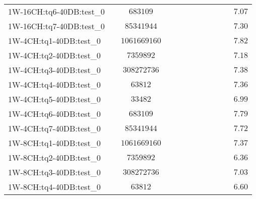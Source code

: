 \begin{tabular}{|l|c|c|c|c|c|c|c|c|c|c|c|}
1W-16CH:tq6-40DB:test\_0  & $          $ & $ 683109      $ & $       $ & $  $ & $    $ & $       $ & $  $ & $   $ & $             $ & $         $ & $ 7.07    $ \\
1W-16CH:tq7-40DB:test\_0  & $          $ & $ 85341944    $ & $       $ & $  $ & $    $ & $       $ & $  $ & $   $ & $             $ & $         $ & $ 7.30    $ \\
1W-4CH:tq1-40DB:test\_0   & $          $ & $ 1061669160  $ & $       $ & $  $ & $    $ & $       $ & $  $ & $   $ & $             $ & $         $ & $ 7.82    $ \\
1W-4CH:tq2-40DB:test\_0   & $          $ & $ 7359892     $ & $       $ & $  $ & $    $ & $       $ & $  $ & $   $ & $             $ & $         $ & $ 7.18    $ \\
1W-4CH:tq3-40DB:test\_0   & $          $ & $ 308272736   $ & $       $ & $  $ & $    $ & $       $ & $  $ & $   $ & $             $ & $         $ & $ 7.38    $ \\
1W-4CH:tq4-40DB:test\_0   & $          $ & $ 63812       $ & $       $ & $  $ & $    $ & $       $ & $  $ & $   $ & $             $ & $         $ & $ 7.36    $ \\
1W-4CH:tq5-40DB:test\_0   & $          $ & $ 33482       $ & $       $ & $  $ & $    $ & $       $ & $  $ & $   $ & $             $ & $         $ & $ 6.99    $ \\
1W-4CH:tq6-40DB:test\_0   & $          $ & $ 683109      $ & $       $ & $  $ & $    $ & $       $ & $  $ & $   $ & $             $ & $         $ & $ 7.79    $ \\
1W-4CH:tq7-40DB:test\_0   & $          $ & $ 85341944    $ & $       $ & $  $ & $    $ & $       $ & $  $ & $   $ & $             $ & $         $ & $ 7.72    $ \\
1W-8CH:tq1-40DB:test\_0   & $          $ & $ 1061669160  $ & $       $ & $  $ & $    $ & $       $ & $  $ & $   $ & $             $ & $         $ & $ 7.37    $ \\
1W-8CH:tq2-40DB:test\_0   & $          $ & $ 7359892     $ & $       $ & $  $ & $    $ & $       $ & $  $ & $   $ & $             $ & $         $ & $ 6.36    $ \\
1W-8CH:tq3-40DB:test\_0   & $          $ & $ 308272736   $ & $       $ & $  $ & $    $ & $       $ & $  $ & $   $ & $             $ & $         $ & $ 7.03    $ \\
1W-8CH:tq4-40DB:test\_0   & $          $ & $ 63812       $ & $       $ & $  $ & $    $ & $       $ & $  $ & $   $ & $             $ & $         $ & $ 6.60    $ \\

\end{tabular}
